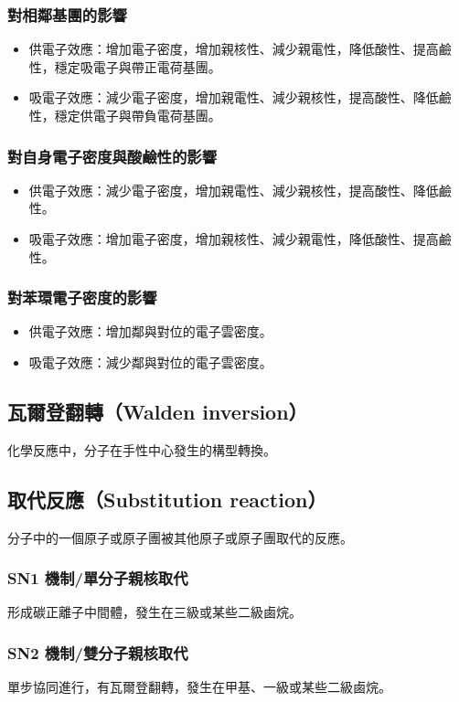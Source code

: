 \documentclass[a4paper,12pt]{report}
\begin{document}
\subsubsection{對相鄰基團的影響}
\begin{itemize}
\item 供電子效應：增加電子密度，增加親核性、減少親電性，降低酸性、提高鹼性，穩定吸電子與帶正電荷基團。
\item 吸電子效應：減少電子密度，增加親電性、減少親核性，提高酸性、降低鹼性，穩定供電子與帶負電荷基團。
\end{itemize}
\subsubsection{對自身電子密度與酸鹼性的影響}
\begin{itemize}
\item 供電子效應：減少電子密度，增加親電性、減少親核性，提高酸性、降低鹼性。
\item 吸電子效應：增加電子密度，增加親核性、減少親電性，降低酸性、提高鹼性。
\end{itemize}
\subsubsection{對苯環電子密度的影響}
\begin{itemize}
\item 供電子效應：增加鄰與對位的電子雲密度。
\item 吸電子效應：減少鄰與對位的電子雲密度。
\end{itemize}
\subsection{瓦爾登翻轉（Walden inversion）}
化學反應中，分子在手性中心發生的構型轉換。
\subsection{取代反應（Substitution reaction）}
分子中的一個原子或原子團被其他原子或原子團取代的反應。
\subsubsection{SN1 機制/單分子親核取代}
形成碳正離子中間體，發生在三級或某些二級鹵烷。
\subsubsection{SN2 機制/雙分子親核取代}
單步協同進行，有瓦爾登翻轉，發生在甲基、一級或某些二級鹵烷。
\end{document}
